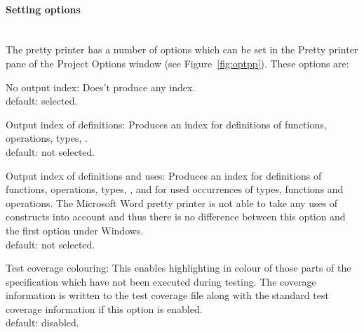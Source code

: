 \documentclass[\pformat,12pt]{article}
\newcommand{\subsubsubsection}[1]{\paragraph{#1}\mbox{}\\}
\newcommand{\guicmd}[1]{{\sf #1}}
\begin{document}
\subsubsubsection{Setting options}

The pretty printer has a number of options which can be set in the 
\guicmd{Pretty printer} pane of the \guicmd{Project Options} window (see
Figure~\ref{fig:optpp}). These options are:

\begin{list}{}{}

\item[{\sf No output index}:] Does't produce any index. \\
  default: selected.

\item[{\sf Output index of definitions}:] Produces an index for
  definitions of functions, operations, types,
  . \\
  default: not selected.
  
\item[{\sf Output index of definitions and uses}:] Produces an index for
  definitions of functions, operations, types,
  ,
    and for used occurrences of types,
    functions and operations. The Microsoft Word pretty printer is not
    able to take any uses of constructs into account and thus there is
    no difference between this option and the first option under Windows.\\ 
  default: not selected.

\item[{\sf Test coverage colouring}:] This enables highlighting
  in colour of those parts of the specification which have not been
  executed during testing. The coverage information is written to the
  test coverage file along with the standard test coverage information
  if this option is enabled. \\
  default: disabled.


\end{list}


\end{document}
